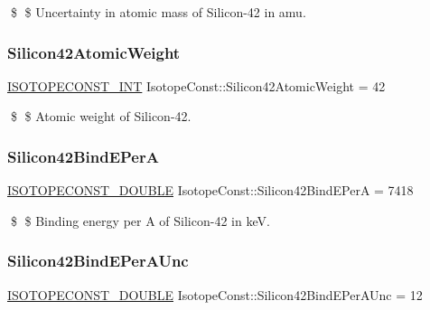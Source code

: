 \$ \$ Uncertainty in atomic mass of Silicon-\/42 in amu. \mbox{\label{group___isotope_const-_silicon-_si42_ga00e9627f4c1e266b69361d1e3fd3bba4}} 
\subsubsection{\texorpdfstring{Silicon42\+Atomic\+Weight}{Silicon42AtomicWeight}}
{\footnotesize\ttfamily \mbox{\hyperlink{group___isotope_const-_macros_ga5f18360b3e99483a35c32d789e62621c}{I\+S\+O\+T\+O\+P\+E\+C\+O\+N\+S\+T\+\_\+\+I\+NT}} Isotope\+Const\+::\+Silicon42\+Atomic\+Weight = 42}

\$ \$ Atomic weight of Silicon-\/42. \mbox{\label{group___isotope_const-_silicon-_si42_gaa89208e1bd65c013e9e6aed0b7f401f3}} 
\subsubsection{\texorpdfstring{Silicon42\+Bind\+E\+PerA}{Silicon42BindEPerA}}
{\footnotesize\ttfamily \mbox{\hyperlink{group___isotope_const-_macros_ga8f45a7272ce02c0b4c65c44636ed719a}{I\+S\+O\+T\+O\+P\+E\+C\+O\+N\+S\+T\+\_\+\+D\+O\+U\+B\+LE}} Isotope\+Const\+::\+Silicon42\+Bind\+E\+PerA = 7418}

\$ \$ Binding energy per A of Silicon-\/42 in keV. \mbox{\label{group___isotope_const-_silicon-_si42_gae9a4323166a7056ccc8409cc725c84c4}} 
\subsubsection{\texorpdfstring{Silicon42\+Bind\+E\+Per\+A\+Unc}{Silicon42BindEPerAUnc}}
{\footnotesize\ttfamily \mbox{\hyperlink{group___isotope_const-_macros_ga8f45a7272ce02c0b4c65c44636ed719a}{I\+S\+O\+T\+O\+P\+E\+C\+O\+N\+S\+T\+\_\+\+D\+O\+U\+B\+LE}} Isotope\+Const\+::\+Silicon42\+Bind\+E\+Per\+A\+Unc = 12}

